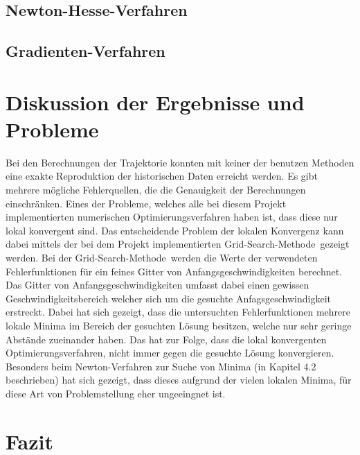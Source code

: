 \subsection{Newton-Hesse-Verfahren}



\subsection{Gradienten-Verfahren}

\section{Diskussion der Ergebnisse und Probleme}

Bei den Berechnungen der Trajektorie konnten mit keiner der benutzen Methoden eine exakte Reproduktion der historischen Daten erreicht werden. Es gibt mehrere mögliche Fehlerquellen, die die Genauigkeit der Berechnungen einschränken. Eines der Probleme, welches alle bei diesem Projekt implementierten numerischen Optimierungsverfahren haben ist, dass diese nur lokal konvergent sind. Das entscheidende  Problem der lokalen Konvergenz kann dabei mittels der bei dem Projekt implementierten \glqq Grid-Search-Methode\grqq\, gezeigt werden. Bei der \glqq Grid-Search-Methode\grqq\, werden die Werte der verwendeten Fehlerfunktionen für ein feines Gitter von Anfangsgeschwindigkeiten berechnet. Das Gitter von Anfangsgeschwindigkeiten umfasst dabei einen gewissen Geschwindigkeitsbereich welcher sich um die gesuchte Anfagsgeschwindigkeit erstreckt. Dabei hat sich gezeigt, dass die untersuchten Fehlerfunktionen mehrere lokale Minima im Bereich der gesuchten Lösung besitzen, welche nur sehr geringe Abstände zueinander haben. Das hat zur Folge, dass die lokal konvergenten Optimierungsverfahren, nicht immer gegen die gesuchte Lösung konvergieren. Besonders beim Newton-Verfahren zur Suche von Minima (in Kapitel 4.2 beschrieben) hat sich gezeigt, dass dieses aufgrund der vielen lokalen Minima, für diese Art von Problemstellung eher ungeeingnet ist.

\section{Fazit}




